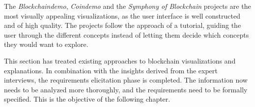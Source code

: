 The \textit{Blockchaindemo}, \textit{Coindemo} and the \textit{Symphony of Blockchain} projects are the most visually appealing visualizations, as the user interface is well constructed and of high quality. The projects follow the approach of a tutorial, guiding the user through the different concepts instead of letting them decide which concepts they would want to explore.

This section has treated existing approaches to blockchain visualizations and explanations. In combination with the insights derived from the expert interviews, the requirements elicitation phase is completed. The information now needs to be analyzed more thoroughly, and the requirements need to be formally specified. This is the objective of the following chapter.